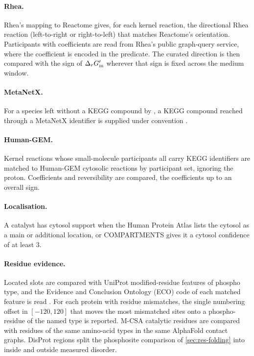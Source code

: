 \paragraph{Rhea.}
Rhea's mapping to Reactome gives, for each kernel reaction, the directional Rhea reaction (left-to-right or right-to-left) that matches Reactome's orientation.
Participants with coefficients are read from Rhea's public graph-query service, where the coefficient is encoded in the predicate.
The curated direction is then compared with the sign of $\Delta_r G'_{\mathrm{m}}$ wherever that sign is fixed across the medium window.

\paragraph{MetaNetX.}
For a species left without a KEGG compound by , a KEGG compound reached through a MetaNetX identifier is supplied under convention .

\paragraph{Human-GEM.}
Kernel reactions whose small-molecule participants all carry KEGG identifiers are matched to Human-GEM cytosolic reactions by participant set, ignoring the proton.
Coefficients and reversibility are compared, the coefficients up to an overall sign.

\paragraph{Localisation.}
A catalyst has cytosol support when the Human Protein Atlas lists the cytosol as a main or additional location, or COMPARTMENTS gives it a cytosol confidence of at least 3.

\paragraph{Residue evidence.}
Located slots are compared with UniProt modified-residue features of phospho type, and the Evidence and Conclusion Ontology (ECO) code of each matched feature is read \citep{giglio2019eco}.
For each protein with residue mismatches, the single numbering offset in $[-120,120]$ that moves the most mismatched sites onto a phospho-residue of the named type is reported.
M-CSA catalytic residues are compared with residues of the same amino-acid types in the same AlphaFold contact graphs.
DisProt regions split the phosphosite comparison of \cref{sec:res-folding} into inside and outside measured disorder.


